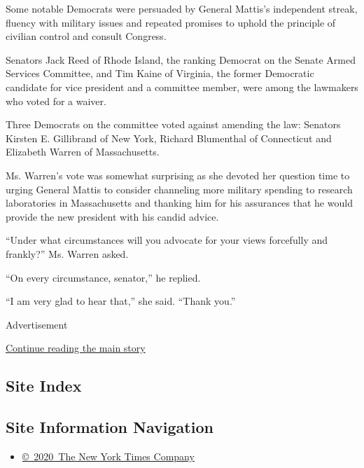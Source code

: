 Some notable Democrats were persuaded by General Mattis's independent
streak, fluency with military issues and repeated promises to uphold the
principle of civilian control and consult Congress.

Senators Jack Reed of Rhode Island, the ranking Democrat on the Senate
Armed Services Committee, and Tim Kaine of Virginia, the former
Democratic candidate for vice president and a committee member, were
among the lawmakers who voted for a waiver.

Three Democrats on the committee voted against amending the law:
Senators Kirsten E. Gillibrand of New York, Richard Blumenthal of
Connecticut and Elizabeth Warren of Massachusetts.

Ms. Warren's vote was somewhat surprising as she devoted her question
time to urging General Mattis to consider channeling more military
spending to research laboratories in Massachusetts and thanking him for
his assurances that he would provide the new president with his candid
advice.

``Under what circumstances will you advocate for your views forcefully
and frankly?'' Ms. Warren asked.

``On every circumstance, senator,'' he replied.

``I am very glad to hear that,'' she said. ``Thank you.''

Advertisement

\protect\hyperlink{after-bottom}{Continue reading the main story}

\hypertarget{site-index}{%
\subsection{Site Index}\label{site-index}}

\hypertarget{site-information-navigation}{%
\subsection{Site Information
Navigation}\label{site-information-navigation}}

\begin{itemize}
\tightlist
\item
  \href{https://help.nytimes.com/hc/en-us/articles/115014792127-Copyright-notice}{©~2020~The
  New York Times Company}
\end{itemize}

